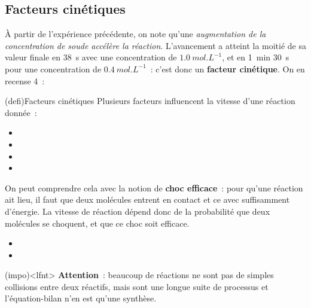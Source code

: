 \documentclass[../../main/main.tex]{subfiles}
\begin{document}
\subsection{Facteurs cinétiques}

À partir de l'expérience précédente, on note qu'une \textit{augmentation de la
	concentration de soude accélère la réaction}. L'avancement a atteint la moitié de
sa valeur finale en \SI{38}{s} avec une concentration de $\SI{1.0}{mol.L^{-1}}$,
et en \SI{1}{min} \SI{30}{s} pour une concentration de $\SI{0.4}{mol.L^{-1}}$~:
c'est donc un \textbf{facteur cinétique}. On en recense 4~:

\begin{tcb}[label=def:factciné, breakable](defi){Facteurs cinétiques}
	Plusieurs facteurs influencent la vitesse d'une réaction donnée~:
	\begin{itemize}
		\item
		\item
		\item
		\item
	\end{itemize}
\end{tcb}

On peut comprendre cela avec la notion de \textbf{choc efficace}~: pour qu'une
réaction ait lieu, il faut que deux molécules entrent en contact et ce avec
suffisamment d'énergie. La vitesse de réaction dépend donc de la probabilité que
deux molécules se choquent, et que ce choc soit efficace.
\begin{itemize}
	\item
	\item
\end{itemize}

\begin{tcb}(impo)<lfnt>{}
	\textbf{Attention}~: beaucoup de réactions ne sont pas de simples collisions
	entre deux réactifs, mais sont une longue suite de processus et l'équation-bilan
	n'en est qu'une synthèse.
\end{tcb}
\end{document}
